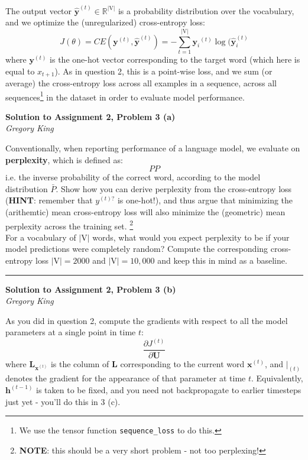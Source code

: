 \documentclass[letter,12pt]{article}
\newcommand{\myhwtitle}[3]
{\begin{center}
{\large {\bf Solution to Assignment {#1}, Problem {#2}}}\\
\medskip
{\it {#3}} %
\end{center}}
\newcommand{\solutionsAuthor}{Gregory King}
\begin{document}
\noindent The output vector ${\hat{\boldsymbol y}}^{(t)}\in\mathbb{R}^{|\textrm{V}|}$ is a probability distribution over the vocabulary, and we optimize the (unregularized) cross-entropy loss:
\begin{equation}
J(\theta) = CE({{\boldsymbol y}}^{(t)},{\hat{\boldsymbol y}}^{(t)}) = -\sum^{|\textrm{V}|}_{t=1} {{\boldsymbol y_{i}}}^{(t)}\log({\hat{\boldsymbol y}}^{(t)}_{i}
\end{equation}
\noindent where ${{\boldsymbol y}}^{(t)}$ is the one-hot vector corresponding to the target word (which here is equal to $x_{t+1}$). As in question 2, this is a point-wise loss, and we sum (or average) the cross-entropy loss across all examples in a sequence, across all sequences\footnote{We use the tensor function \texttt{sequence\_loss} to do this.} in the dataset in order to evaluate model performance. \\
\clearpage
\myhwtitle{2}{3 (a)}{\solutionsAuthor}

\noindent Conventionally, when reporting performance of a language model, we evaluate on \textbf{perplexity}, which is defined as:
\begin{equation}
PP
\end{equation}
i.e. the inverse probability of the correct word, according to  the model distribution $\bar{P}$. Show how you can derive perplexity from the cross-entropy loss (\textbf{HINT}: remember that $y^{(t)?}$ is one-hot!), and thus argue that minimizing the (arithemtic) mean cross-entropy loss will also minimize the (geometric) mean perplexity across the training set. \footnote{\textbf{NOTE}: this should be a very short problem - not too perplexing!}\\

\noindent For a vocabulary of $|\textrm{V}|$ words, what would you expect perplexity to be if your model predictions were completely random? Compute the corresponding cross-entropy loss $|\textrm{V}|=2000$ and $|\textrm{V}|=10,000$ and keep this in mind as a baseline.\vspace{5mm}\\

\noindent\rule{\textwidth}{0.4pt}

\clearpage

\myhwtitle{2}{3 (b)}{\solutionsAuthor}

\bigskip

\noindent As you did in question 2, compute the gradients with respect to all the model parameters at a single point in time $t$:
\begin{equation}
\frac{\partial{J^(t)}}{\partial{\boldsymbol U}}
\end{equation}
where ${\boldsymbol L}_{{\boldsymbol x}^{(t)}}$ is the column of ${\boldsymbol L}$ corresponding to the current word ${{\boldsymbol x}^{(t)}}$, and $\big\rvert_{(t)}$ denotes the gradient for the appearance of that parameter at time $t$. Equivalently, ${\boldsymbol h}^{(t-1)}$ is taken to be fixed, and you need not backpropagate to earlier timesteps just yet - you'll do this in 3 (c). \\
\end{document}
